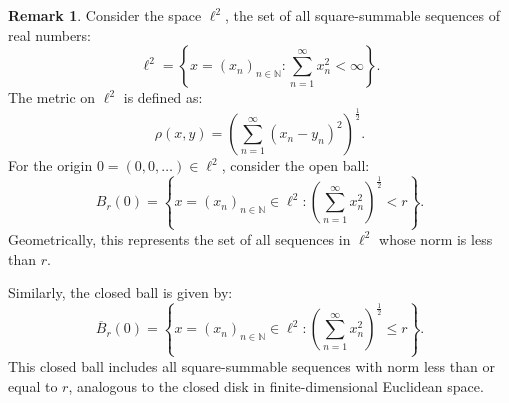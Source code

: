 \documentclass[12pt, reqno]{amsart}
\theoremstyle{definition}
\newtheorem{example}[theorem]{Example}
\newtheorem{remark}[theorem]{Remark}
\numberwithin{equation}{section}
\newcommand{\dN}{{\mathbb N}}
\begin{document}
\begin{comment}
\begin{example}
Consider \(\mathbb{R}^2\) with the Euclidean metric \(\rho((x_1, y_1), (x_2, y_2)) = \sqrt{(x_1 - x_2)^2 + (y_1 - y_2)^2}\).\\
The set \(B_1((0, 0)) = \{(x, y) \in \mathbb{R}^2 : \sqrt{x^2 + y^2} < 1\}\) is an open ball in \(\mathbb{R}^2\). Geometrically, this represents the interior of a circle of radius 1 centered at the origin.\\
The set \(\overline{B}_1((0, 0)) = \{(x, y) \in \mathbb{R}^2 : \sqrt{x^2 + y^2} \leq 1\}\) is a closed ball in \(\mathbb{R}^2\), which corresponds to the closed disk of radius 1 centered at the origin, including all the points on the boundary.
\end{example}
\end{comment}

\begin{remark}
    Consider the space \( \ell^2 \), the set of all square-summable sequences of real numbers:
    $$
    \ell^2 = \left\{ x = (x_n)_{n \in \dN} : \sum_{n=1}^\infty x_n^2 < \infty \right\}.
    $$
    The metric on \( \ell^2 \) is defined as:
    $$
    \rho(x, y) = \left( \sum_{n=1}^\infty (x_n - y_n)^2 \right)^{\frac{1}{2}}.
    $$
    For the origin \( 0 = (0, 0, \dots) \in \ell^2 \), consider the open ball:
    $$
    B_r(0) = \left\{ x = (x_n)_{n \in \dN} \in \ell^2 : \left( \sum_{n=1}^\infty x_n^2 \right)^{\frac{1}{2}} < r \right\}.
    $$
    Geometrically, this represents the set of all sequences in \( \ell^2 \) whose norm is less than \( r \). 

    Similarly, the closed ball is given by:
    $$
    \overline{B}_r(0) = \left\{ x = (x_n)_{n \in \dN} \in \ell^2 : \left( \sum_{n=1}^\infty x_n^2 \right)^{\frac{1}{2}} \leq r \right\}.
    $$
    This closed ball includes all square-summable sequences with norm less than or equal to \( r \), analogous to the closed disk in finite-dimensional Euclidean space.
\end{remark}
\end{document}
